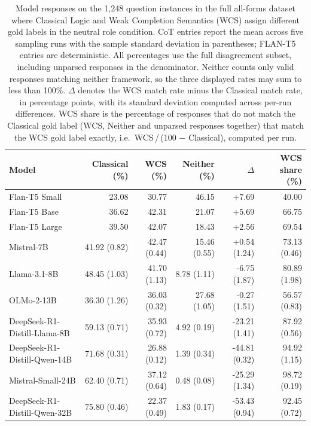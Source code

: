 \begin{table}[H]
\caption{Model responses on the 1,248 question instances in the full all-forms dataset where Classical Logic and Weak Completion Semantics (WCS) assign different gold labels in the neutral role condition. CoT entries report the mean across five sampling runs with the sample standard deviation in parentheses; FLAN-T5 entries are deterministic. All percentages use the full disagreement subset, including unparsed responses in the denominator. Neither counts only valid responses matching neither framework, so the three displayed rates may sum to less than 100\%. $\Delta$ denotes the WCS match rate minus the Classical match rate, in percentage points, with its standard deviation computed across per-run differences. WCS share is the percentage of responses that do not match the Classical gold label (WCS, Neither and unparsed responses together) that match the WCS gold label exactly, i.e.\ WCS\,/\,(100 $-$ Classical), computed per run.}
\label{tab:disagreement-neutral-final2}
\small
\setlength{\tabcolsep}{3.5pt}
\begin{tabular}{lrrrrr}
\toprule
Model & Classical (\%) & WCS (\%) & Neither (\%) & $\Delta$ & WCS share (\%) \\
\midrule
Flan-T5 Small & 23.08 & 30.77 & 46.15 & +7.69 & 40.00 \\
Flan-T5 Base & 36.62 & 42.31 & 21.07 & +5.69 & 66.75 \\
Flan-T5 Large & 39.50 & 42.07 & 18.43 & +2.56 & 69.54 \\
Mistral-7B & 41.92 (0.82) & 42.47 (0.44) & 15.46 (0.55) & +0.54 (1.24) & 73.13 (0.46) \\
Llama-3.1-8B & 48.45 (1.03) & 41.70 (1.13) & 8.78 (1.11) & -6.75 (1.87) & 80.89 (1.98) \\
OLMo-2-13B & 36.30 (1.26) & 36.03 (0.32) & 27.68 (1.05) & -0.27 (1.51) & 56.57 (0.83) \\
DeepSeek-R1-Distill-Llama-8B & 59.13 (0.71) & 35.93 (0.72) & 4.92 (0.19) & -23.21 (1.41) & 87.92 (0.56) \\
DeepSeek-R1-Distill-Qwen-14B & 71.68 (0.31) & 26.88 (0.12) & 1.39 (0.34) & -44.81 (0.32) & 94.92 (1.15) \\
Mistral-Small-24B & 62.40 (0.71) & 37.12 (0.64) & 0.48 (0.08) & -25.29 (1.34) & 98.72 (0.19) \\
DeepSeek-R1-Distill-Qwen-32B & 75.80 (0.46) & 22.37 (0.49) & 1.83 (0.17) & -53.43 (0.94) & 92.45 (0.72) \\
\bottomrule
\end{tabular}
\end{table}
